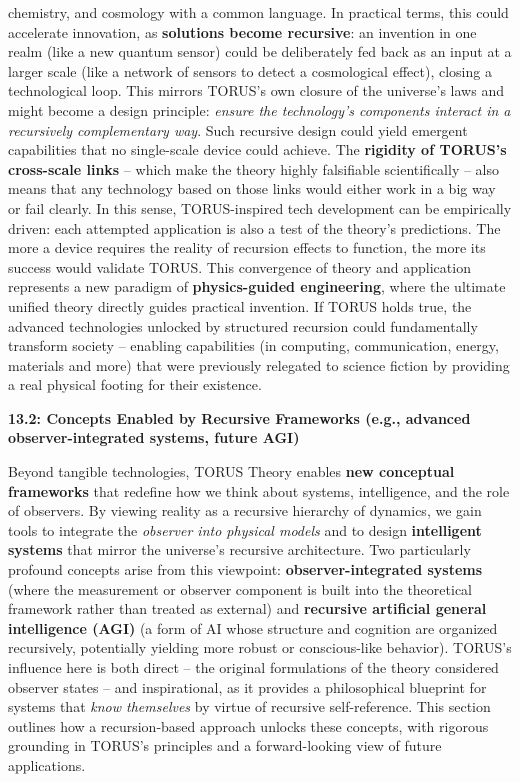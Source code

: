 \documentclass[
]{article}
\begin{document}
\begin{itemize}
  chemistry, and cosmology with a common language. In practical terms,
  this could accelerate innovation, as \textbf{solutions become
  recursive}: an invention in one realm (like a new quantum sensor)
  could be deliberately fed back as an input at a larger scale (like a
  network of sensors to detect a cosmological effect), closing a
  technological loop. This mirrors TORUS's own closure of the universe's
  laws and might become a design principle: \emph{ensure the
  technology's components interact in a recursively complementary way}.
  Such recursive design could yield emergent capabilities that no
  single-scale device could achieve. The \textbf{rigidity of TORUS's
  cross-scale links} -- which make the theory highly falsifiable
  scientifically\hspace{0pt} -- also means that any technology based on
  those links would either work in a big way or fail clearly. In this
  sense, TORUS-inspired tech development can be empirically driven: each
  attempted application is also a test of the theory's predictions. The
  more a device requires the reality of recursion effects to function,
  the more its success would validate TORUS. This convergence of theory
  and application represents a new paradigm of \textbf{physics-guided
  engineering}, where the ultimate unified theory directly guides
  practical invention. If TORUS holds true, the advanced technologies
  unlocked by structured recursion could fundamentally transform society
  -- enabling capabilities (in computing, communication, energy,
  materials and more) that were previously relegated to science fiction
  by providing a real physical footing for their existence.
\end{itemize}

\textbf{13.2: Concepts Enabled by Recursive Frameworks (e.g., advanced
observer-integrated systems, future AGI)}

Beyond tangible technologies, TORUS Theory enables \textbf{new
conceptual frameworks} that redefine how we think about systems,
intelligence, and the role of observers. By viewing reality as a
recursive hierarchy of dynamics, we gain tools to integrate the
\emph{observer into physical models} and to design \textbf{intelligent
systems} that mirror the universe's recursive architecture. Two
particularly profound concepts arise from this viewpoint:
\textbf{observer-integrated systems} (where the measurement or observer
component is built into the theoretical framework rather than treated as
external) and \textbf{recursive artificial general intelligence (AGI)}
(a form of AI whose structure and cognition are organized recursively,
potentially yielding more robust or conscious-like behavior). TORUS's
influence here is both direct -- the original formulations of the theory
considered observer states -- and inspirational, as it provides a
philosophical blueprint for systems that \emph{know themselves} by
virtue of recursive self-reference. This section outlines how a
recursion-based approach unlocks these concepts, with rigorous grounding
in TORUS's principles and a forward-looking view of future applications.
\end{document}
